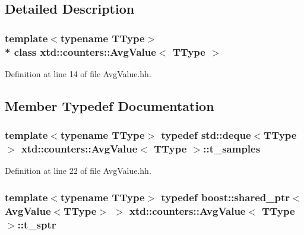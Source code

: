 \subsection{Detailed Description}
\subsubsection*{template$<$typename T\+Type$>$\\*
class xtd\+::counters\+::\+Avg\+Value$<$ T\+Type $>$}



Definition at line 14 of file Avg\+Value.\+hh.



\subsection{Member Typedef Documentation}
\subsubsection[{\texorpdfstring{t\+\_\+samples}{t_samples}}]{\setlength{\rightskip}{0pt plus 5cm}template$<$typename T\+Type$>$ typedef std\+::deque$<$T\+Type$>$ {\bf xtd\+::counters\+::\+Avg\+Value}$<$ T\+Type $>$\+::{\bf t\+\_\+samples}\hspace{0.3cm}{\ttfamily [protected]}}\hypertarget{classxtd_1_1counters_1_1AvgValue_aa58af8a852f52342b087373414e61878}{}\label{classxtd_1_1counters_1_1AvgValue_aa58af8a852f52342b087373414e61878}


Definition at line 22 of file Avg\+Value.\+hh.

\subsubsection[{\texorpdfstring{t\+\_\+sptr}{t_sptr}}]{\setlength{\rightskip}{0pt plus 5cm}template$<$typename T\+Type$>$ typedef boost\+::shared\+\_\+ptr$<${\bf Avg\+Value}$<$T\+Type$>$ $>$ {\bf xtd\+::counters\+::\+Avg\+Value}$<$ T\+Type $>$\+::{\bf t\+\_\+sptr}}\hypertarget{classxtd_1_1counters_1_1AvgValue_a2186c119cedc1cd9c3a7a7a39e0bdc55}{}\label{classxtd_1_1counters_1_1AvgValue_a2186c119cedc1cd9c3a7a7a39e0bdc55}


